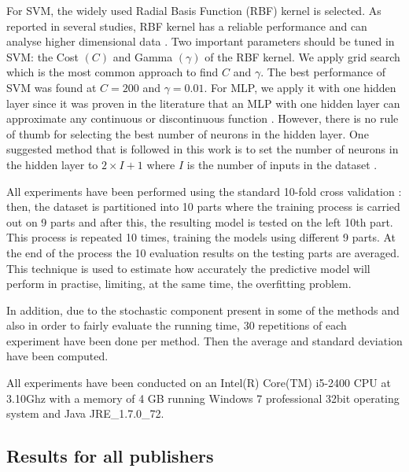 \documentclass[a4paper,10pt,twocolumn,preprint,3p]{elsarticle}
\begin{document}
For SVM, the widely used Radial Basis Function (RBF) kernel is selected. 
As reported in several studies, RBF kernel has a reliable performance and 
can analyse higher dimensional data \cite{yu2004ec,chao2015construction}. 
Two important parameters should be tuned in SVM: the Cost $(C)$ and 
Gamma $(\gamma)$ of the RBF kernel. 
We apply grid search which is the most common approach to find $C$ and $\gamma$. 
The best performance of SVM was found at $C=200$ and $\gamma = 0.01$. 
For MLP, we apply it with one hidden layer since it was proven in the literature 
that an MLP with one hidden layer can approximate any continuous or discontinuous
function \cite{hornik1989multilayer,mirjalili2014let}. However, there
is no rule of thumb for selecting the best number of neurons in the
hidden layer. One suggested method that is followed in this work is to
set the number of neurons in the hidden layer to $2 \times I + 1$
where $I$ is the number of inputs in the dataset
\cite{wdaa2008differential,mirjalili2014let,mirjalili2015effective}. 

All experiments have been performed using the standard 10-fold cross validation \cite{Geisser1993,Kohavi1995,Devijver1982}: then, the dataset is partitioned into 10 parts where the training process is carried out on 9 parts and after this, the resulting model is tested on the left 10th part. This process is repeated 10 times, training the models using different 9 parts. At the end of the process the 10 evaluation results on the testing parts are averaged. 
This technique is used to estimate how accurately the predictive model will perform in practise, limiting, at the same time, the overfitting problem.

In addition, due to the stochastic component present in some of the methods and also in order to fairly evaluate the running time, 30 repetitions of each experiment have been done per method. Then the average and standard deviation have been computed.

All experiments have been conducted on an Intel(R) Core(TM) i5-2400 CPU at 3.10Ghz with a memory of 4 GB running Windows 7 professional 32bit operating system and Java JRE\_1.7.0\_72.



\subsection{Results for all publishers}
\label{subsec:results_all_publishers}
\end{document}
